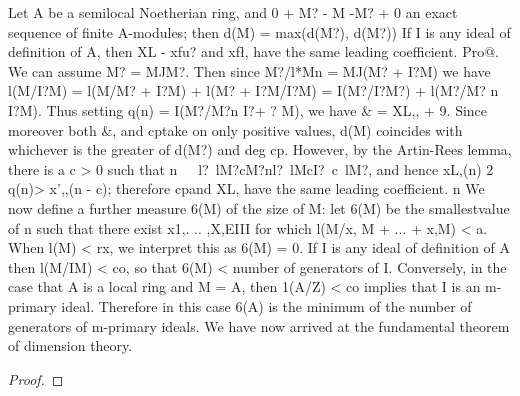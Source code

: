 \begin{theorem}[Theorem 13.3]\label{mcrt-auto-theorem-13-3}\uses{}
\begin{mathematicalrecord}
Let A be a semilocal Noetherian ring, and 0 + M? -
M -M?   + 0 an exact sequence of finite A-modules; then
         d(M) = max(d(M?),       d(M?))
If I is any ideal of definition of A, then XL - xfu? and xf\l, have the same
 leading coefficient.
Pro@. We can assume M? = MJM?. Then since M?/l*Mn = MJ(M? + I?M)
we have
         l(M/I?M)   = l(M/M? + I?M) + l(M? + I?M/I?M)
                    = I(M?/I?M?) + l(M?/M? n I?M).
Thus setting q(n) = I(M?/M?n        I?+ ? M), we have & = XL,, + 9. Since
moreover both &, and cptake on only positive values, d(M) coincides with
whichever is the greater of d(M?) and deg cp. However, by the Artin-Rees
lemma, there is a c > 0 such that
         n~~~l?~lM?cM?nl?~lMcI?~c~lM?,
and hence
         xL,(n) 2 q(n)>   x',,(n - c);
therefore cpand XL, have the same leading coefficient. n
    We now define a further measure 6(M) of the size of M: let 6(M) be the
smallestvalue of n such that there exist x1,. .. ,X,EIII for which l(M/x, M +
... + x,M) < a. When l(M) < rx, we interpret this as 6(M) = 0. If I is any
ideal of definition of A then l(M/IM) < co, so that 6(M) < number of
generators of I. Conversely, in the case that A is a local ring and M = A,
then 1(A/Z) < co implies that I is an m-primary ideal. Therefore in this case
6(A) is the minimum of the number of generators of m-primary ideals.
    We have now arrived at the fundamental theorem of dimension theory.
\end{mathematicalrecord}
\end{theorem}
\begin{proof}
\notready
\end{proof}


